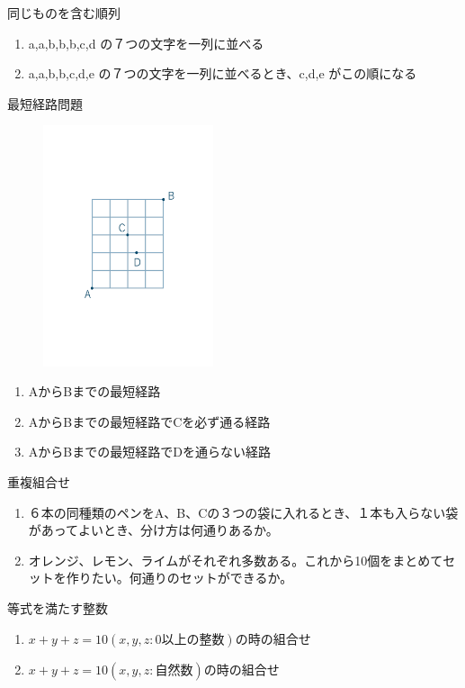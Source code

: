 \documentclass[10pt,dvipdfmx]{jsarticle}
\begin{document}
\begin{itembox}[l]{同じものを含む順列}
  \begin{enumerate}
    \item a,a,b,b,b,c,d の７つの文字を一列に並べる
    \item a,a,b,b,c,d,e の７つの文字を一列に並べるとき、c,d,e がこの順になる
  \end{enumerate}
\end{itembox}
\begin{itembox}[l]{最短経路問題}
  \begin{figure}
    \includegraphics[width=5cm]{keiro.pdf}
  \end{figure}

  \begin{enumerate}
    \item AからBまでの最短経路
    \item AからBまでの最短経路でCを必ず通る経路
    \item AからBまでの最短経路でDを通らない経路
  \end{enumerate}
\end{itembox}
\begin{itembox}[l]{重複組合せ}
  \begin{enumerate}
    \item ６本の同種類のペンをA、B、Cの３つの袋に入れるとき、１本も入らない袋があってよいとき、分け方は何通りあるか。
    \item オレンジ、レモン、ライムがそれぞれ多数ある。これから10個をまとめてセットを作りたい。何通りのセットができるか。
  \end{enumerate}
\end{itembox}

\begin{itembox}[l]{等式を満たす整数}
  \begin{enumerate}
    \item $x+y+z=10(x,y,z:0以上の整数)$の時の組合せ
    \item $x+y+z=10(x,y,z:自然数)$の時の組合せ
  \end{enumerate}
\end{itembox}
\end{document}
